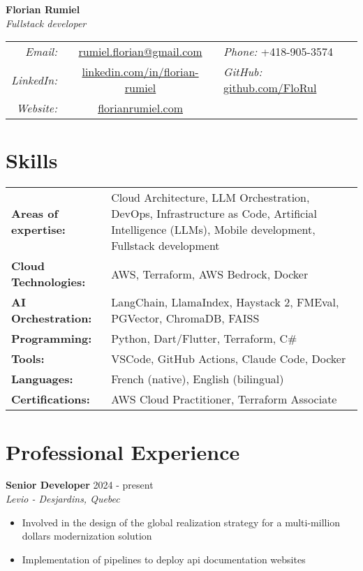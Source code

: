 ﻿\documentclass[11pt,letterpaper]{article}
\begin{document}
\begin{center}
  {\LARGE\textbf{Florian Rumiel}} \\[0.3em]
  {\large\textit{Fullstack developer}} \\[0.5em]
  \begin{tabular}{r c l}
    \textit{Email:} & \href{mailto:rumiel.florian@gmail.com}{rumiel.florian@gmail.com} & \textit{Phone:} +418-905-3574 \\
    \textit{LinkedIn:} & \href{https://linkedin.com/in/florian-rumiel}{linkedin.com/in/florian-rumiel} & \textit{GitHub:} \href{https://github.com/FloRul}{github.com/FloRul} \\
    \textit{Website:} & \href{https://florian-rumiel.com}{florianrumiel.com} \\
  \end{tabular}
\end{center}

\section*{Skills}
\begin{tabularx}{\textwidth}{@{}l X@{}}
\textbf{Areas of expertise:} & Cloud Architecture, LLM Orchestration, DevOps, Infrastructure as Code, Artificial Intelligence (LLMs), Mobile development, Fullstack development \\[0.2em]
\textbf{Cloud Technologies:} & AWS, Terraform, AWS Bedrock, Docker \\[0.2em]
\textbf{AI Orchestration:} & LangChain, LlamaIndex, Haystack 2, FMEval, PGVector, ChromaDB, FAISS \\[0.2em]
\textbf{Programming:} & Python, Dart/Flutter, Terraform, C\# \\[0.2em]
\textbf{Tools:} & VSCode, GitHub Actions, Claude Code, Docker \\[0.2em]
\textbf{Languages:} & French (native), English (bilingual) \\
\textbf{Certifications:} & AWS Cloud Practitioner, Terraform Associate \\
\end{tabularx}

\section*{Professional Experience}

\textbf{Senior Developer} \hfill 2024 - present\\
\textit{Levio - Desjardins, Quebec}
\begin{itemize}
\item Involved in the design of the global realization strategy for a multi-million dollars modernization solution
\item Implementation of pipelines to deploy api documentation websites
\end{itemize}
\end{document}
